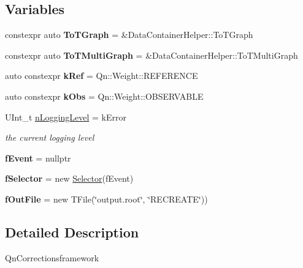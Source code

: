 \subsection*{Variables}
\begin{DoxyCompactItemize}
\item 
\mbox{\label{namespaceQn_a55789420b16028c41a093acf3c393cc7}} 
constexpr auto {\bfseries To\+T\+Graph} = \&Data\+Container\+Helper\+::\+To\+T\+Graph
\item 
\mbox{\label{namespaceQn_a1afc52cdbc249c7748612cc7607fd81f}} 
constexpr auto {\bfseries To\+T\+Multi\+Graph} = \&Data\+Container\+Helper\+::\+To\+T\+Multi\+Graph
\item 
\mbox{\label{namespaceQn_a25c930ea42c6cc92cae7131d07f6adab}} 
auto constexpr {\bfseries k\+Ref} = Qn\+::\+Weight\+::\+R\+E\+F\+E\+R\+E\+N\+CE
\item 
\mbox{\label{namespaceQn_a1a0fe6a8a4890b52f42216a432470fdd}} 
auto constexpr {\bfseries k\+Obs} = Qn\+::\+Weight\+::\+O\+B\+S\+E\+R\+V\+A\+B\+LE
\item 
\mbox{\label{namespaceQn_aa2756cb8d50cf57265734d2a01ef6beb}} 
U\+Int\+\_\+t \mbox{\hyperlink{namespaceQn_aa2756cb8d50cf57265734d2a01ef6beb}{n\+Logging\+Level}} = k\+Error
\begin{DoxyCompactList}\small\item\em the current logging level \end{DoxyCompactList}\item 
\mbox{\label{namespaceQn_a7102d1e3f1d1a81e21eb926b4cac177f}} 
{\bfseries f\+Event} = nullptr
\item 
\mbox{\label{namespaceQn_a7c9556a4043ca2cf5852b68a59c6d8b1}} 
{\bfseries f\+Selector} = new \mbox{\hyperlink{classSelector}{Selector}}(f\+Event)
\item 
\mbox{\label{namespaceQn_a83db516c1691f0acac32cd43e28820e8}} 
{\bfseries f\+Out\+File} = new T\+File(\char`\"{}output.\+root\char`\"{}, \char`\"{}R\+E\+C\+R\+E\+A\+TE\char`\"{}))
\end{DoxyCompactItemize}


\subsection{Detailed Description}
Qn\+Correctionsframework 

